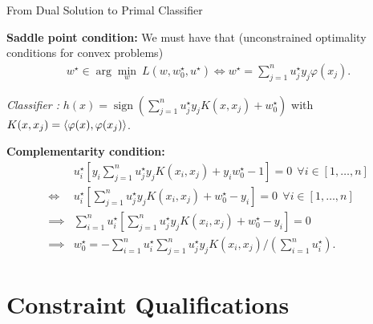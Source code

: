 \documentclass[9pt]{beamer}
\begin{document}
\begin{frame}{From Dual Solution to Primal Classifier}

  \textbf{Saddle point condition:} We must have that (unconstrained optimality conditions for convex problems)
  \[
    \begin{array}{rl}
      w^\star \in \arg\min_w~ L(w, w_0^\star, u^\star) \iff w^\star= \sum_{j=1}^n u^\star_j y_j \varphi(x_j).
    \end{array}
  \]

  \vfill

  \emph{Classifier :} $h(x) = \operatorname{sign}(\sum_{j=1}^n u^\star_j y_j K(x, x_j) + w^\star_0)$ with $K(x, x_j)=\left<\varphi(x), \varphi(x_j)\right>$. 

  \vfill

  \textbf{Complementarity condition:}
  \[
    \begin{array}{rl}
       &  u^\star_i  [y_i\sum_{j=1}^n  u^\star_j y_j K(x_i, x_j) + y_iw^\star_0-1]= 0 ~~\forall i \in [1,\dots, n]\\[0.5em]
      \iff &  u^\star_i  [\sum_{j=1}^n  u^\star_j y_j K(x_i, x_j) + w^\star_0-y_i]= 0~~\forall i \in [1,\dots, n]\\[0.5em]
      \implies & \sum_{i=1}^n u^\star_i  [\sum_{j=1}^n  u^\star_j y_j K(x_i, x_j) + w^\star_0-y_i] = 0\\[0.5em]
          \implies &      w^\star_0 = -\sum_{i=1}^n u^\star_i \sum_{j=1}^n u^\star_j y_j K(x_i, x_j)/(\sum_{i=1}^n u_i^\star).
    \end{array}
  \]
  
\end{frame}

\section{Constraint Qualifications}
\end{document}
